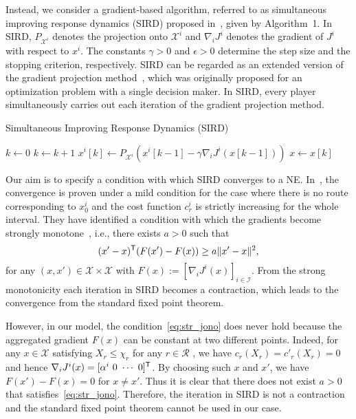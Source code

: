 \documentclass[letterpaper, 10 pt, conference]{ieeeconf}  %
\newcommand{\mc}[1]{\mathcal{#1}}
\begin{document}
Instead, we consider a gradient-based algorithm, referred to as simultaneous improving response dynamics (SIRD) proposed in~\cite{Jacquot2018Analysis}, given by Algorithm~1.
In SIRD, $P_{\mc{X}^i}$ denotes the projection onto $\mc{X}^i$ and $\nabla_i J^i$ denotes the gradient of $J^i$ with respect to $x^i$.
The constants $\gamma>0$ and $\epsilon>0$ determine the step size and the stopping criterion, respectively.
SIRD can be regarded as an extended version of the gradient projection method~\cite[Sec.~2.3]{Bertsekas1998Nonlinear}, which was originally proposed for an optimization problem with a single decision maker.
In SIRD, every player simultaneously carries out each iteration of the gradient projection method.

\begin{algorithm}[th]
\caption{Simultaneous Improving Response Dynamics (SIRD)}
\begin{algorithmic}[1]
\STATE $k \leftarrow 0$
\REPEAT
\STATE $k\leftarrow k+1$
\STATE $x^i[k] \leftarrow P_{\mc{X}^i}(x^i[k-1]-\gamma\nabla_i J^i(x[k-1]))$
\ENDFOR
\STATE $x\leftarrow x[k]$
\end{algorithmic}
\end{algorithm}

Our aim is to specify a condition with which SIRD converges to a NE.
In~\cite{Jacquot2018Analysis}, the convergence is proven under a mild condition for the case where there is no route corresponding to $x^i_0$ and the cost function $c^i_r$ is strictly increasing for the whole interval.
They have identified a condition with which the gradients become strongly monotone~\cite[Definition 2.3.1]{Facchinei2003Finite}, i.e., there exists $a>0$ such that
\begin{equation}\label{eq:str_jono}
 (x'-x)^{\sf T}(F(x')-F(x)) \geq a\|x'-x\|^2,
\end{equation}
for any $(x,x')\in\mc{X}\times\mc{X}$ with $F(x):=[\nabla_i J^i(x)]_{i \in \mc{I}}$.
From the strong monotonicity each iteration in SIRD becomes a contraction, which leads to the convergence from the standard fixed point theorem.

However, in our model, the condition~\eqref{eq:str_jono} does never hold because the aggregated gradient $F(x)$ can be constant at two different points.
Indeed, for any $x\in\mc{X}$ satisfying $X_r\leq \chi_r$ for any $r\in\mc{R}$ , we have $c_r(X_r)=c'_r(X_r)=0$ and hence $\nabla_iJ^i(x)=[\alpha^i\ 0\ \cdots\ 0]^{\sf T}$.
By choosing such $x$ and $x'$, we have $F(x')-F(x)=0$ for $x\neq x'$.
Thus it is clear that there does not exist $a>0$ that satisfies~\eqref{eq:str_jono}.
Therefore, the iteration in SIRD is not a contraction and the standard fixed point theorem cannot be used in our case.
\end{document}
